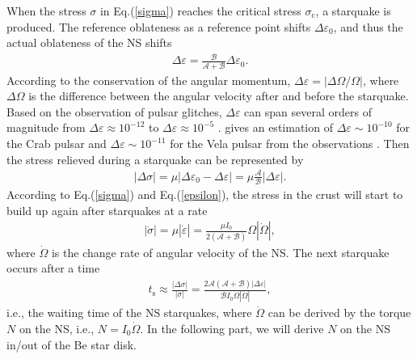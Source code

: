 \documentclass[twocolumn]{aastex62}
\begin{document}
When the stress $\sigma$ in Eq.(\ref{sigma}) reaches the critical stress $\sigma_{\text{c}}$, a starquake is produced.
The reference oblateness as a reference point shifts $\Delta \varepsilon_{0}$, and thus the actual oblateness of the NS shifts
\begin{eqnarray}
\Delta \varepsilon = \frac{\mathcal{B}}{\mathcal{A}+\mathcal{B}} \Delta \varepsilon_{0}.
\end{eqnarray}
According to the conservation of the angular momentum, $\Delta \varepsilon = |\Delta \Omega/ \Omega|$, where $\Delta \Omega$ is the difference between the angular velocity after and before the starquake.
Based on the observation of pulsar glitches, $\Delta \varepsilon$ can span several orders of magnitude from $\Delta \varepsilon \approx 10^{-12}$ to $\Delta \varepsilon \approx 10^{-5}$ \citep{esp11}.
\cite{lai18} gives an estimation of $\Delta \varepsilon\sim 10^{-10}$ for the Crab pulsar and $\Delta \varepsilon\sim10^{-11}$ for the Vela pulsar from the observations \citep{esp11}.
Then the stress relieved during a starquake can be represented by
\begin{eqnarray}
|\Delta \sigma | = \mu |\Delta \varepsilon_{0} - \Delta \varepsilon| = \mu \frac{\mathcal{A}}{\mathcal{B}} |\Delta \varepsilon |.
\end{eqnarray}
According to Eq.(\ref{sigma}) and Eq.(\ref{epsilon}), the stress in the crust will start to build up again after starquakes at a rate
\begin{eqnarray}
| \dot{\sigma} |=  \mu | \dot{\varepsilon} |= \frac{\mu I_{0}}{2(\mathcal{A}+\mathcal{B})} \Omega |\dot{\Omega}|,
\end{eqnarray}
where $\dot{\Omega}$ is the change rate of angular velocity of the NS.
The next starquake occurs after a time \citep{has15}
\begin{eqnarray}
t_{\text{s}} \approx \frac{|\Delta \sigma |}{|\dot{\sigma}|} = \frac{2\mathcal{A}(\mathcal{A} + \mathcal{B}) |\Delta \varepsilon|}{\mathcal{B} I_0 \Omega |\dot{\Omega}|},
\label{ts}
\end{eqnarray}
i.e., the waiting time of the NS starquakes, where $\dot{\Omega}$ can be derived by the torque $N$ on the NS, i.e., $N = I_0 \dot{\Omega}$. In the following part, we will derive $N$ on the NS in/out of the Be star disk.
\end{document}
